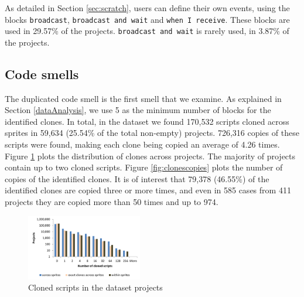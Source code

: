 \documentclass{sig-alternate-05-2015}
\begin{document}
As detailed in Section \ref{sec:scratch}, users can define their own events, using the blocks \texttt{broadcast}, \texttt{broadcast and wait} and \texttt{when I receive}. These blocks are used in 29.57\% of the projects. \texttt{broadcast and wait} is rarely used, in 3.87\% of the projects.

\noindent
{}


\subsection{Code smells}
\label{RQ3}
The duplicated code smell is the first smell that we examine. As explained in Section \ref{dataAnalysis}, we use 5 as the minimum number of blocks for the identified clones. In total, in the dataset we found 170,532 scripts cloned across sprites in 59,634 (25.54\% of the total non-empty) projects. 726,316 copies of these scripts were found, making each clone being copied an average of 4.26 times. Figure \ref{fig:clonesprojects} plots the distribution of clones across projects. The majority of projects contain up to two cloned scripts. Figure \ref{fig:clonescopies} plots the number of copies of the identified clones. It is of interest that 79,378 (46.55\%) of the identified clones are copied three or more times, and even in 585 cases from 411 projects they are copied more than 50 times and up to 974.\footnotemark[\ref{repo}]

\begin{figure}
	\centering
	\includegraphics[width=0.45\textwidth]{fig/charts/11clonesprojects}
	\vspace{-1em}
	\caption{Cloned scripts in the dataset projects}
	\label{fig:clonesprojects}
\end{figure}
\end{document}
